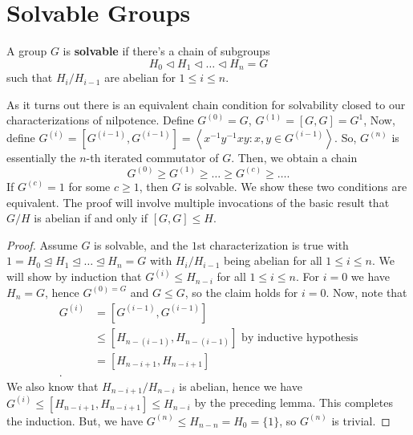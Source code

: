 \section{Solvable Groups}
\begin{definition}
	A group \(G\) is \textbf{solvable} if there's a chain  of subgroups \[
	H_0 \triangleleft H_1 \triangleleft \ldots \triangleleft H_{n} = G
	\] such that \(H_{i} / H_{ i -1}\) are abelian for \(1 \le i \le n\).
\end{definition}
As it turns out there is an equivalent chain condition for solvability closed to our characterizations of nilpotence.
Define \(G^{\left( 0 \right) } = G\), \(G^{\left( 1 \right) } = \left[ G, G \right]  = G^{1}\), Now, define \(G^{\left( i \right) } = \left[ G^{\left( i-1 \right) }, G^{\left( i-1 \right) } \right] = \left<x^{-1}y^{-1}xy : x, y \in G^{\left( i-1 \right) } \right>  \). So, \(G^{\left( n \right) }\) is essentially the \(n\)-th iterated commutator of \(G\). Then, we obtain a chain \[
	G^{\left( 0 \right) }\ge G^{\left( 1 \right) } \ge \ldots \ge G^{\left( c \right) } \ge \ldots
.\]
If \(G^{\left( c \right) } = 1\) for some \(c \ge 1\), then \(G\) is solvable. We show these two conditions are equivalent. The proof will involve multiple invocations of the basic result that \(G / H\) is abelian if and only if \(\left[ G, G \right]  \le H\).
\begin{proof}
	Assume \(G\) is solvable, and the \(1\)st characterization is true with \(1 = H_0 \trianglelefteq H_1 \trianglelefteq \ldots \trianglelefteq H_{n} = G\) with \(H_{i} / H_{ i -1}\) being abelian for all \(1 \le i \le n\). We will show by induction that \(G^{\left( i \right) }\le H_{n - i}\) for all \(1\le i \le n\). For \( i = 0\) we have \(H_{n} = G\), hence \(G^{\left( 0 \right) = G}\) and \(G \le G\), so the claim holds for \(i = 0\). Now, note that
	\begin{align*}
		G^{\left( i \right) } &= \left[ G^{\left( i - 1 \right) }, G^{\left( i - 1 \right) } \right] \\
				      &\le \left[ H_{n - \left( i - 1 \right) }, H_{n - \left( i - 1 \right) } \right] \text{ by inductive hypothesis} \\
				      &= \left[ H_{ n - i + 1}, H_{n - i + 1} \right]  \\
	.\end{align*}
	We also know that \(H_{ n - i + 1} / H_{ n - i}\) is abelian, hence we have \(G^{\left( i \right) } \le \left[H_{ n - i + 1}, H_{n - i + 1}  \right] \le H_{n - i} \) by the preceding lemma. This completes the induction. But, we have \(G^{\left( n \right) }\le H_{n - n } = H_0 = \{1\} \), so \(G^{\left( n \right) }\) is trivial.
\end{proof}
